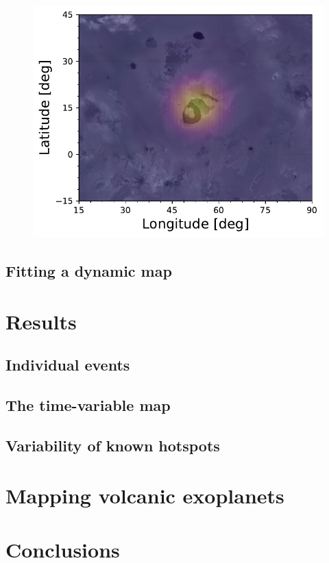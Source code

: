 \documentclass[modern]{aastex62}
\begin{document}
\begin{figure}[h!]
    \begin{centering}
    \includegraphics[width=.5\linewidth]{figures/irtf_ingress_egress_loki.pdf}
    \end{centering}
\end{figure}


\subsection{Fitting a dynamic map}
\label{ssec:dynamic_map}

\section{Results}
\label{sec:results}

\subsection{Individual events}
\label{ssec:individual}

\subsection{The time-variable map}
\label{ssec:time_variable_map}
%

\subsection{Variability of known hotspots}
\label{ssec:variability_hotspots}

\section{Mapping volcanic exoplanets}
\label{sec:exoplanets}

\section{Conclusions}
\label{sec:conclusions}


\end{document}
